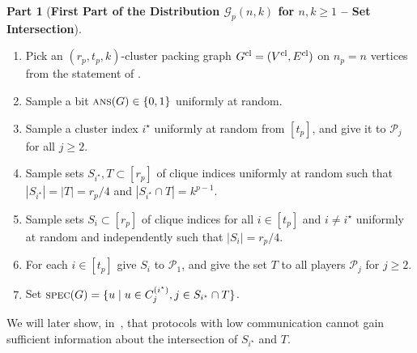 \documentclass[11pt]{article}
\theoremstyle{definition}
\newenvironment{ourbox}{\begin{mdframed}[hidealllines=false,innerleftmargin=10pt,backgroundcolor=white!10,innertopmargin=5pt,innerbottommargin=5pt,roundcorner=10pt]}{\end{mdframed}}
\newtheorem{mddistributionpart}{Part}
\newenvironment{Part}{\begin{ourbox}\begin{mddistributionpart}}{
		\end{mddistributionpart}
\end{ourbox}}
\renewcommand{\geq}{\geqslant}
\newcommand{\card}[1]{\left\vert{#1}\right\vert}
\newcommand{\player}[1]{\ensuremath{\mathcal{P}_{#1}}}
\newcommand{\cG}{\ensuremath{\mathcal{G}}}
\newcommand{\cliqnum}[2]{\ensuremath{C^{(#1)}_{#2}}}
\newcommand{\ans}{\ensuremath{\textnormal{\textsc{ans}}}}
\newcommand{\spec}{\ensuremath{\textnormal{\textsc{spec}}}}
\newcommand{\istar}{\ensuremath{i^{\star}}}
\newcommand{\Varc}{\ensuremath{V_{\textnormal{arc}}}}
\begin{document}
	\begin{Part}[\textbf{First Part of the Distribution $\cG_p(n,k)$ for $n, k \geq 1$ -- Set Intersection}]\label{distpart:set-int}
		~
		\begin{enumerate}[label=$(\roman*)$]
			\item Pick an $(r_p, t_p, k)$-cluster packing graph $G^{\textnormal{cl}} = (V^{\textnormal{cl}}, E^{\textnormal{cl}})$ on $n_p = n$ vertices from the statement of .\label{part:adv-set-int-cluster}
			
			\item Sample a bit $\ans(G) \in \{0,1\}$ uniformly at random. \label{part:set-int-ans}
			
			
			\item Sample a cluster index $\istar$ uniformly at random from $[t_p]$, and give it to $\player{j}$ for all $j \geq 2$. \label{part:set-int-istar}
			\item Sample sets $S_{\istar}, T \subset [r_p]$ of clique indices uniformly at random such that $\card{S_{\istar}} = \card{T} = r_p/4$ and $\card{S_{\istar} \cap T } = k^{p-1}$.\label{part:set-int-Sstar}
			
			\item Sample sets $S_i \subset [r_p]$ of clique indices for all $i \in [t_p]$ and $i \neq \istar$ uniformly at random and independently such that $\card{S_i} = r_p/4$. 
			
			
			\item For each $i\in [t_p]$ give $S_i$ to $\player{1}$, and give the set $T$ to all players $\player{j}$ for $j \geq 2$.
			
			\item Set $\spec(G) = \{u \mid u \in \cliqnum{\istar}{j}, j \in S_{\istar} \cap T\}$. 
		\end{enumerate}
	\end{Part}
	
	

	We will later show, in~, that protocols with low communication cannot gain sufficient information about the intersection of $S_{\istar}$ and $T$.
\end{document}
